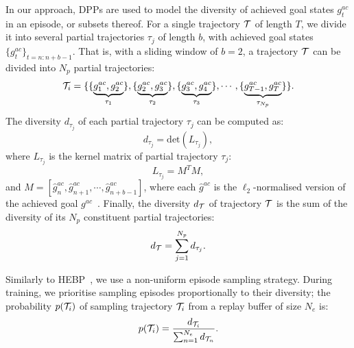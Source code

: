 In our approach, DPPs are used to model the diversity of achieved goal states $g^{ac}_{t}$ in an episode, or subsets thereof. For a single trajectory $\mathcal{T}$ of length $T$, we divide it into several partial trajectories $\tau_{j}$ of length $b$, with achieved goal states $\{g^{ac}_{t}\}_{t=n:n+b-1}$. That is, with a sliding window of $b = 2$, a trajectory $\mathcal{T}$ can be divided into $N_p$ partial trajectories:
\begin{equation}
    \mathcal{T}_{i} = \{\{\underbrace{g^{ac}_{1}, g^{ac}_{2}}_{\tau_{1}}\}, \{\underbrace{g^{ac}_{2}, g^{ac}_{3}}_{\tau_{2}}\}, \{\underbrace{g^{ac}_{3}, g^{ac}_{4}}_{\tau_{3}}\}, \cdots, \{\underbrace{g^{ac}_{T-1}, g^{ac}_{T}}_{\tau_{N_{p}}}\}\}.
\end{equation}
The diversity $d_{\tau_{j}}$ of each partial trajectory $\tau_{j}$ can be computed as:
\begin{equation}
    d_{\tau_{j}} = \text{det}(L_{\tau_{j}}), 
\label{eq:partial_div}
\end{equation}
where $L_{\tau_{j}}$ is the kernel matrix of partial trajectory $\tau_{j}$:
\begin{equation}
    L_{\tau_{j}} = M^{T}M,
\end{equation}
and $M=[\hat{g}^{ac}_{n}, \hat{g}^{ac}_{n+1}, \cdots, \hat{g}^{ac}_{n+b-1}]$, where each $\hat{g}^{ac}$ is the $\ell_2$-normalised version of the achieved goal $g^{ac}$~\cite{kulesza2011k}. Finally, the diversity $d_{\mathcal{T}}$ of trajectory $\mathcal{T}$ is the sum of the diversity of its $N_p$ constituent partial trajectories:
\begin{equation}
    d_{\mathcal{T}} = \sum_{j=1}^{N_{p}} d_{\tau_{j}}.
\label{eq:total_div}
\end{equation}

Similarly to HEBP~\cite{zhao2018energy}, we use a non-uniform episode sampling strategy. During training, we prioritise sampling episodes proportionally to their diversity; the probability $p(\mathcal{T}_{i})$ of sampling trajectory $\mathcal{T}_{i}$ from a replay buffer of size $N_{e}$ is:
\begin{equation}
    p(\mathcal{T}_{i}) = \frac{d_{\mathcal{T}_{i}}}{\sum_{n=1}^{N_{e}} d_{\mathcal{T}_{n}}}.
\label{eq:diversity_priority}
\end{equation}

